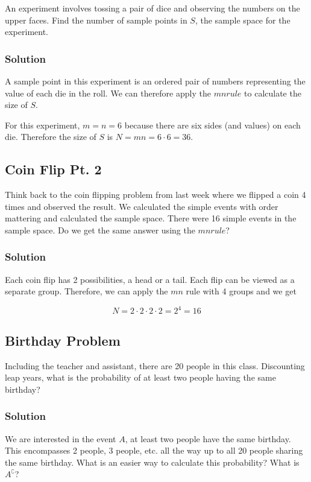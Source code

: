 \documentclass[11pt]{article}
\theoremstyle{definition}
\begin{document}
An experiment involves tossing a pair of dice and observing the numbers on the upper faces. Find the number of sample points in $S$, the sample space for the experiment.

\subsubsection*{Solution}

A sample point in this experiment is an ordered pair of numbers representing the value of each die in the roll. We can therefore apply the $mn rule$ to calculate the size of $S$.

For this experiment, $m = n = 6$ because there are six sides (and values) on each die. Therefore the size of $S$ is $N = mn = 6\cdot6 = 36$.

\subsection{Coin Flip Pt. 2}

Think back to the coin flipping problem from last week where we flipped a coin 4 times and observed the result. We calculated the simple events with order mattering and calculated the sample space. There were 16 simple events in the sample space. Do we get the same answer using the $mn rule$?

\subsubsection*{Solution}

Each coin flip has 2 possibilities, a head or a tail. Each flip can be viewed as a separate group. Therefore, we can apply the $mn$ rule with 4 groups and we get

$$
	N = 2 \cdot 2 \cdot 2 \cdot 2 = 2^4 = 16
$$

\subsection{Birthday Problem}

Including the teacher and assistant, there are 20 people in this class. Discounting leap years, what is the probability of at least two people having the same birthday?

\subsubsection*{Solution}

We are interested in the event $A$, at least two people have the same birthday. This encompasses 2 people, 3 people, etc. all the way up to all 20 people sharing the same birthday. What is an easier way to calculate this probability? What is $A^\complement$?
\end{document}
